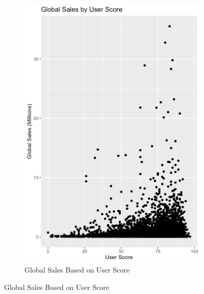 \documentclass[12pt,english]{article}
\begin{document}
\begin{figure}[ht]
\begin{subfigure}{0.49\linewidth}
    \includegraphics[width=\linewidth]{Figures/sales_user_score.png}
    \caption{Global Sales Based on User Score}
    \label{fig:fig6}
\end{subfigure}
\label{fig:combined3}
\end{figure}
\end{document}
